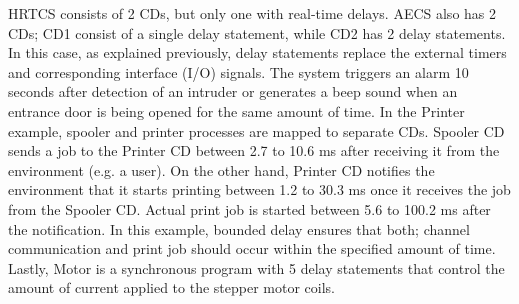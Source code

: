 
HRTCS consists of 2 CDs, but only one with real-time delays. AECS also
has 2 CDs; CD1 consist of a single delay statement, while CD2 has 2
delay statements. In this case, as explained previously, delay
statements replace the external timers and corresponding interface (I/O)
signals. The system triggers an alarm 10 seconds after detection of an
intruder or generates a beep sound when an entrance door is being opened
for the same amount of time. In the Printer example, spooler and printer
processes are mapped to separate CDs. Spooler CD sends a job to the
Printer CD between 2.7 to 10.6 ms after receiving it from the
environment (e.g. a user). On the other hand, Printer CD notifies the
environment that it starts printing between 1.2 to 30.3 ms once it
receives the job from the Spooler CD. Actual print job is started
between 5.6 to 100.2 ms after the notification. In this example, bounded
delay ensures that both; channel communication and print job should
occur within the specified amount of time. Lastly, Motor is a
synchronous program with 5 delay statements that control the amount of
current applied to the stepper motor coils.





